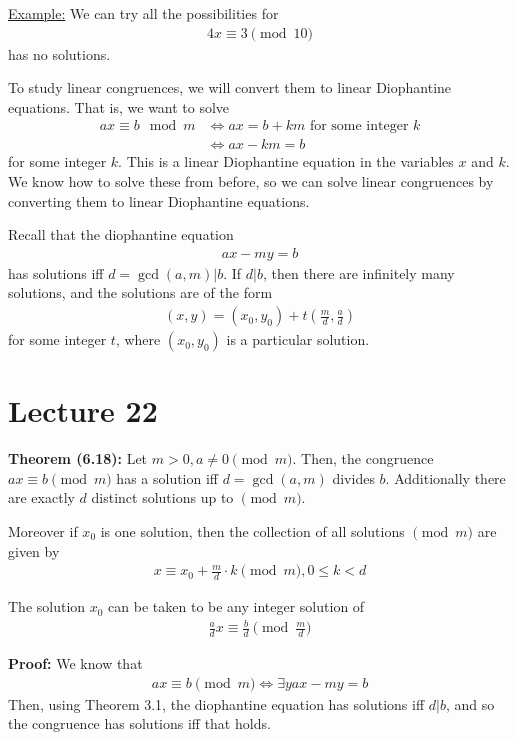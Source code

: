 \documentclass{article}
\begin{document}
\underline{Example:} We can try all the possibilities for \begin{align*}
    4x\equiv 3\pmod 10
\end{align*}has no solutions.

To study linear congruences, we will convert them to linear Diophantine equations. That is, we want to solve \begin{align*}
    ax\equiv b\mod m&\iff ax=b+km\text{ for some integer } k\\
    &\iff ax-km=b
\end{align*}for some integer $k$. This is a linear Diophantine equation in the variables $x$ and $k$. We know how to solve these from before, so we can solve linear congruences by converting them to linear Diophantine equations.

Recall that the diophantine equation \begin{align*}
    ax-my=b
\end{align*} has solutions iff $d=\gcd(a,m)|b$. If $d|b$, then there are infinitely many solutions, and the solutions are of the form \begin{align*}
    (x,y)=(x_0,y_0)+t\left(\frac{m}{d}, \frac{a}{d}\right)
\end{align*}for some integer $t$, where $(x_0,y_0)$ is a particular solution.

\section{Lecture 22}

\textbf{Theorem (6.18):} Let $m>0, a\neq 0\pmod m$. Then, the congruence $ax\equiv b\pmod m$ has a solution iff $d=\gcd(a,m)$ divides $b$. Additionally there are exactly $d$ distinct solutions up to $\pmod m$.

Moreover if $x_0$ is one solution, then the collection of all solutions $\pmod m$ are given by \begin{align*}
    x\equiv x_0+\frac{m}{d}\cdot k\pmod m, 0\leq k<d
\end{align*}

The solution $x_0$ can be taken to be any integer solution of \begin{align*}
    \frac{a}{d}x\equiv \frac{b}{d}\pmod{\frac{m}{d}}
\end{align*}

\textbf{Proof:} We know that \begin{align*}
    ax\equiv b\pmod m \iff \exists y ax-my=b
\end{align*}
Then, using Theorem 3.1, the diophantine equation has solutions iff $d|b$, and so the congruence has solutions iff that holds. 
\end{document}
